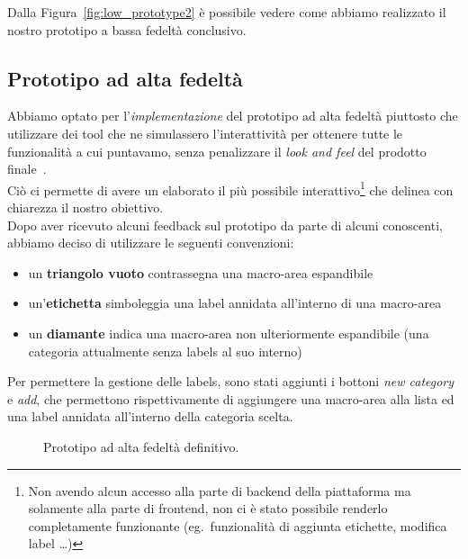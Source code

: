 \documentclass[12pt]{article} %
\begin{document}
Dalla Figura~\ref{fig:low_prototype2} \`e possibile vedere come abbiamo realizzato il nostro prototipo a bassa fedelt\`a conclusivo.\\

\subsection{Prototipo ad alta fedelt\`a}
Abbiamo optato per l'\emph{implementazione} del prototipo ad alta fedelt\`a piuttosto che utilizzare dei tool che ne simulassero l'interattivit\`a per ottenere tutte le funzionalit\`a a cui puntavamo, senza penalizzare il \emph{look and feel} del prodotto finale~\cite[p.~263]{InteractionDesign}.\\
Ci\`o ci permette di avere un elaborato il pi\`u possibile interattivo\footnote{Non avendo alcun accesso alla parte di backend della piattaforma ma solamente alla parte di frontend, non ci \`e stato possibile renderlo completamente funzionante (eg.\ funzionalit\`a di aggiunta etichette, modifica label \dots)} che delinea con chiarezza il nostro obiettivo.\\
Dopo aver ricevuto alcuni feedback sul prototipo da parte di alcuni conoscenti, abbiamo deciso di utilizzare le seguenti convenzioni:
\begin{itemize}
\item un \textbf{triangolo vuoto} contrassegna una macro-area espandibile
\item un'\textbf{etichetta} simboleggia una label annidata all'interno di una macro-area
\item un \textbf{diamante} indica una macro-area non ulteriormente espandibile (una categoria attualmente senza labels al suo interno)
\end{itemize}
Per permettere la gestione delle labels, sono stati aggiunti i bottoni \emph{new category} e \emph{add}, che permettono rispettivamente di aggiungere una macro-area alla lista ed una label annidata all'interno della categoria scelta.

\begin{figure}[H]
\caption{Prototipo ad alta fedelt\`a definitivo.}
\label{fig:dopo}
\end{figure}
\end{document}
